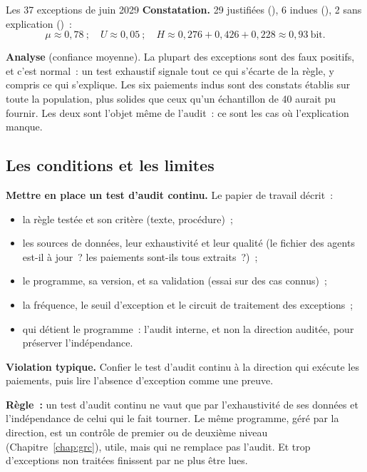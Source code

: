 \begin{boxlecture}{Les 37 exceptions de juin 2029}
\textbf{Constatation.} 29 justifiées (\OUI{}), 6 indues (\NON{}), 2 sans
explication (\NEK{})~:
\[
\mu \approx 0{,}78~;\quad U \approx 0{,}05~;\quad
H \approx 0{,}276 + 0{,}426 + 0{,}228 \approx 0{,}93~\text{bit}.
\]

\textbf{Analyse} (confiance moyenne). La plupart des exceptions sont des
faux positifs, et c'est normal~: un test exhaustif signale tout ce qui
s'écarte de la règle, y compris ce qui s'explique. Les six paiements indus
sont des constats établis sur toute la population, plus solides que ceux
qu'un échantillon de 40 aurait pu fournir. Les deux \NEK{} sont l'objet
même de l'audit~: ce sont les cas où l'explication manque.

\medskip
\hfill{}
\end{boxlecture}

\subsection{Les conditions et les limites}

\begin{boxprocedure}
\textbf{Mettre en place un test d'audit continu.} Le papier de travail
décrit~:
\begin{itemize}
    \item la règle testée et son critère (texte, procédure)~;
    \item les sources de données, leur exhaustivité et leur qualité (le
          fichier des agents est-il à jour~? les paiements sont-ils tous
          extraits~?)~;
    \item le programme, sa version, et sa validation (essai sur des cas
          connus)~;
    \item la fréquence, le seuil d'exception et le circuit de traitement
          des exceptions~;
    \item qui détient le programme~: l'audit interne, et non la direction
          auditée, pour préserver l'indépendance.
\end{itemize}
\end{boxprocedure}

\begin{boxalert}
\textbf{Violation typique.} Confier le test d'audit continu à la direction
qui exécute les paiements, puis lire l'absence d'exception comme une preuve.

\smallskip
\textbf{Règle~:} un test d'audit continu ne vaut que par l'exhaustivité de
ses données et l'indépendance de celui qui le fait tourner. Le même
programme, géré par la direction, est un contrôle de premier ou de deuxième
niveau (Chapitre~\ref{chap:grc}), utile, mais qui ne remplace pas l'audit.
Et trop d'exceptions non traitées finissent par ne plus être lues.
\end{boxalert}

